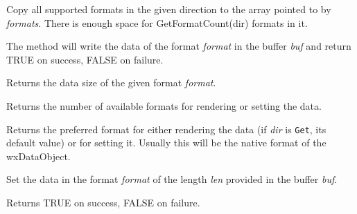 \label{wxdataobjectgetallformats}


Copy all supported formats in the given direction to the array pointed to by 
{\it formats}. There is enough space for GetFormatCount(dir) formats in it.

\label{wxdataobjectgetdatahere}


The method will write the data of the format {\it format} in the buffer {\it
buf} and return TRUE on success, FALSE on failure.

\label{wxdataobjectgetdatasize}


Returns the data size of the given format {\it format}.

\label{wxdataobjectgetformatcount}


Returns the number of available formats for rendering or setting the data.

\label{wxdataobjectgetpreferredformat}


Returns the preferred format for either rendering the data (if {\it dir} is {\tt Get},
its default value) or for setting it. Usually this will be the
native format of the wxDataObject.

\label{wxdataobjectsetdata}


Set the data in the format {\it format} of the length {\it len} provided in the
buffer {\it buf}.

Returns TRUE on success, FALSE on failure.

